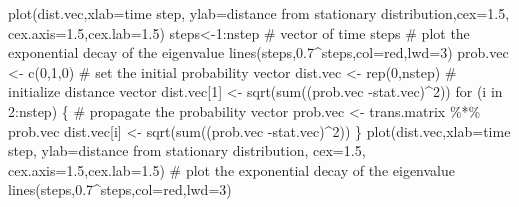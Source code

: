 \documentclass[
  letterpaper,
  DIV=11,
  numbers=noendperiod]{scrreprt}
\newenvironment{Shaded}{\begin{snugshade}}{\end{snugshade}}
\newcommand{\AttributeTok}[1]{\textcolor[rgb]{0.40,0.45,0.13}{#1}}
\newcommand{\CommentTok}[1]{\textcolor[rgb]{0.37,0.37,0.37}{#1}}
\newcommand{\ControlFlowTok}[1]{\textcolor[rgb]{0.00,0.23,0.31}{#1}}
\newcommand{\DecValTok}[1]{\textcolor[rgb]{0.68,0.00,0.00}{#1}}
\newcommand{\FloatTok}[1]{\textcolor[rgb]{0.68,0.00,0.00}{#1}}
\newcommand{\FunctionTok}[1]{\textcolor[rgb]{0.28,0.35,0.67}{#1}}
\newcommand{\NormalTok}[1]{\textcolor[rgb]{0.00,0.23,0.31}{#1}}
\newcommand{\OtherTok}[1]{\textcolor[rgb]{0.00,0.23,0.31}{#1}}
\newcommand{\SpecialCharTok}[1]{\textcolor[rgb]{0.37,0.37,0.37}{#1}}
\newcommand{\StringTok}[1]{\textcolor[rgb]{0.13,0.47,0.30}{#1}}
\begin{document}
\begin{Shaded}
\begin{Highlighting}[]
\FunctionTok{plot}\NormalTok{(dist.vec,}\AttributeTok{xlab=}\StringTok{\textquotesingle{}time step\textquotesingle{}}\NormalTok{, }\AttributeTok{ylab=}\StringTok{\textquotesingle{}distance from stationary distribution\textquotesingle{}}\NormalTok{,}\AttributeTok{cex=}\FloatTok{1.5}\NormalTok{, }\AttributeTok{cex.axis=}\FloatTok{1.5}\NormalTok{,}\AttributeTok{cex.lab=}\FloatTok{1.5}\NormalTok{)}
\NormalTok{steps}\OtherTok{\textless{}{-}}\DecValTok{1}\SpecialCharTok{:}\NormalTok{nstep }\CommentTok{\# vector of time steps }
\CommentTok{\# plot the exponential decay of the eigenvalue}
\FunctionTok{lines}\NormalTok{(steps,}\FloatTok{0.7}\SpecialCharTok{\^{}}\NormalTok{steps,}\AttributeTok{col=}\StringTok{\textquotesingle{}red\textquotesingle{}}\NormalTok{,}\AttributeTok{lwd=}\DecValTok{3}\NormalTok{) }
\NormalTok{prob.vec }\OtherTok{\textless{}{-}} \FunctionTok{c}\NormalTok{(}\DecValTok{0}\NormalTok{,}\DecValTok{1}\NormalTok{,}\DecValTok{0}\NormalTok{) }\CommentTok{\# set the initial probability vector}
\NormalTok{dist.vec }\OtherTok{\textless{}{-}} \FunctionTok{rep}\NormalTok{(}\DecValTok{0}\NormalTok{,nstep) }\CommentTok{\# initialize distance vector}
\NormalTok{dist.vec[}\DecValTok{1}\NormalTok{] }\OtherTok{\textless{}{-}} \FunctionTok{sqrt}\NormalTok{(}\FunctionTok{sum}\NormalTok{((prob.vec }\SpecialCharTok{{-}}\NormalTok{stat.vec)}\SpecialCharTok{\^{}}\DecValTok{2}\NormalTok{))}
\ControlFlowTok{for}\NormalTok{ (i }\ControlFlowTok{in} \DecValTok{2}\SpecialCharTok{:}\NormalTok{nstep) \{ }\CommentTok{\# propagate the probability vector}
\NormalTok{  prob.vec }\OtherTok{\textless{}{-}}\NormalTok{ trans.matrix }\SpecialCharTok{\%*\%}\NormalTok{ prob.vec}
\NormalTok{  dist.vec[i] }\OtherTok{\textless{}{-}} \FunctionTok{sqrt}\NormalTok{(}\FunctionTok{sum}\NormalTok{((prob.vec }\SpecialCharTok{{-}}\NormalTok{stat.vec)}\SpecialCharTok{\^{}}\DecValTok{2}\NormalTok{))}
\NormalTok{\}}
\FunctionTok{plot}\NormalTok{(dist.vec,}\AttributeTok{xlab=}\StringTok{\textquotesingle{}time step\textquotesingle{}}\NormalTok{, }\AttributeTok{ylab=}\StringTok{\textquotesingle{}distance from stationary distribution\textquotesingle{}}\NormalTok{, }\AttributeTok{cex=}\FloatTok{1.5}\NormalTok{, }\AttributeTok{cex.axis=}\FloatTok{1.5}\NormalTok{,}\AttributeTok{cex.lab=}\FloatTok{1.5}\NormalTok{)}
 \CommentTok{\# plot the exponential decay of the eigenvalue}
\FunctionTok{lines}\NormalTok{(steps,}\FloatTok{0.7}\SpecialCharTok{\^{}}\NormalTok{steps,}\AttributeTok{col=}\StringTok{\textquotesingle{}red\textquotesingle{}}\NormalTok{,}\AttributeTok{lwd=}\DecValTok{3}\NormalTok{)}
\end{Highlighting}
\end{Shaded}
\end{document}
